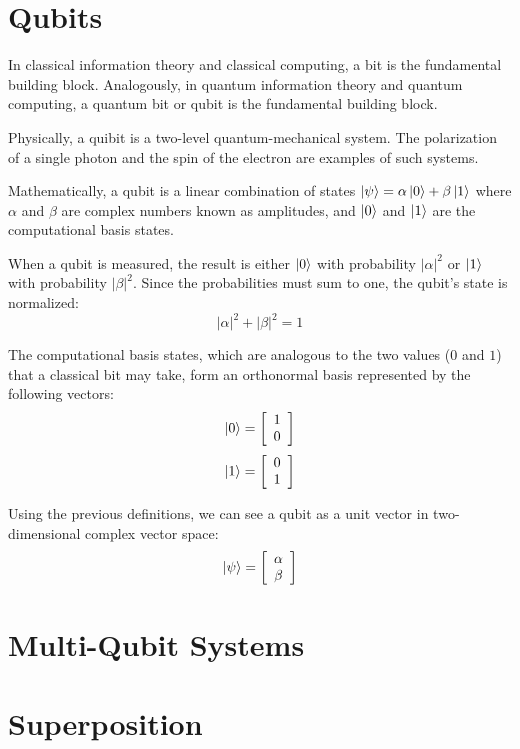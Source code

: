 \section{Qubits}

In classical information theory and classical computing, a bit is the fundamental building block.
Analogously, in quantum information theory and quantum computing, a quantum bit or qubit is the fundamental building block.

Physically, a quibit is a two-level quantum-mechanical system. The polarization of a single photon and the spin of the electron are examples of such systems.

Mathematically, a qubit is a linear combination of states $\left|{\psi}\right\rangle=\alpha\left|{0}\right\rangle+\beta\left|{1}\right\rangle$ where $\alpha$ and $\beta$ are complex numbers known as amplitudes, and $\left|{0}\right\rangle$ and $\left|{1}\right\rangle$ are the computational basis states.

When a qubit is measured, the result is either $\left|{0}\right\rangle$ with probability $|\alpha|^2$ or $\left|{1}\right\rangle$ with probability $|\beta|^2$.
Since the probabilities must sum to one, the qubit's state is normalized:
$$|\alpha|^2+|\beta|^2=1$$

The computational basis states, which are analogous to the two values ($0$ and $1$) that a classical bit may take, form an orthonormal basis represented by the following vectors:
$$\left|{0}\right\rangle=\left[\begin{array}{c}1 \\ 0\end{array}\right]$$
$$\left|{1}\right\rangle=\left[\begin{array}{c}0 \\ 1\end{array}\right]$$

Using the previous definitions, we can see a qubit as a unit vector in two-dimensional complex vector space:
\[\left|{\psi}\right\rangle=\left[\begin{array}{c}\alpha \\ \beta\end{array}\right]\]

\section{Multi-Qubit Systems}


\section{Superposition}

